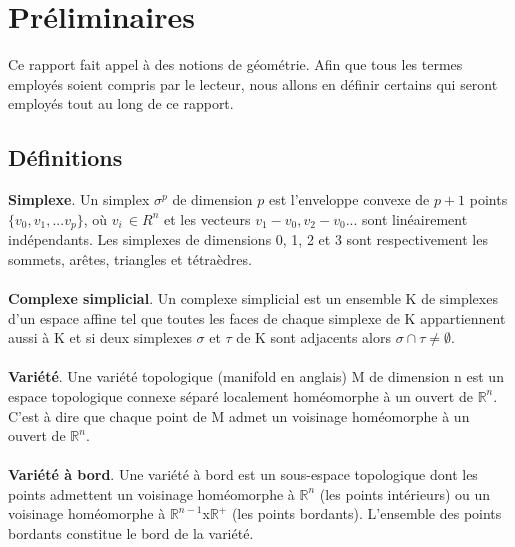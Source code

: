 \newpage
\section{Préliminaires}
\noindent
Ce rapport fait appel à des notions de géométrie. Afin que tous les termes employés soient compris par le lecteur, nous allons en définir certains qui seront employés tout au long de ce rapport.
\subsection{Définitions}
\noindent
\textbf{Simplexe}. Un simplex $\sigma^p$ de dimension $p$ est l'enveloppe convexe de $p+1$ points $\{v_0,v_1,...v_p\}$, où $v_i\, \in R^n$ et les vecteurs $v_1-v_0,v_2-v_0...$ sont linéairement indépendants. Les simplexes de dimensions 0, 1, 2 et 3 sont respectivement les sommets, arêtes, triangles et tétraèdres.\\\\
\textbf{Complexe simplicial}. Un complexe simplicial est un ensemble K de simplexes d'un espace affine tel que toutes les faces de chaque simplexe de K appartiennent aussi à K et si deux simplexes $\sigma$ et $\tau$ de K sont adjacents alors $\sigma \cap \tau \neq \emptyset$.\\\\
\textbf{Variété}. Une variété topologique (manifold en anglais) M de dimension n est un espace topologique connexe séparé localement homéomorphe à un ouvert de $\mathbb{R}^n$. C'est à dire que chaque point de M admet un voisinage homéomorphe à un ouvert de $\mathbb{R}^n$.\\\\
\textbf{Variété à bord}. Une variété à bord est un sous-espace topologique dont les points admettent un voisinage homéomorphe à $\mathbb{R}^n$ (les points intérieurs) ou un voisinage homéomorphe à $\mathbb{R}^{n-1}  $x$ \mathbb{R}^+$ (les points bordants). L'ensemble des points bordants constitue le bord de la variété.\\\\

